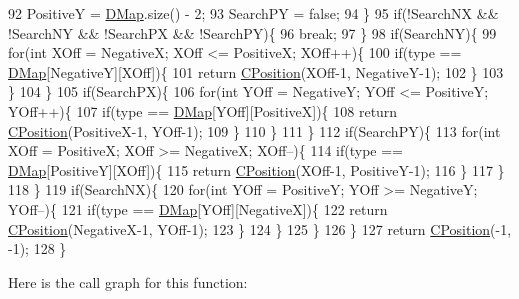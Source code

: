 \begin{DoxyCode}
92             PositiveY = \hyperlink{classCTerrainMap_a80d154ce478948b10473534a7bca13f6}{DMap}.size() - 2;
93             SearchPY = \textcolor{keyword}{false};
94         \}
95         \textcolor{keywordflow}{if}(!SearchNX && !SearchNY && !SearchPX && !SearchPY)\{
96             \textcolor{keywordflow}{break};
97         \}
98         \textcolor{keywordflow}{if}(SearchNY)\{
99             \textcolor{keywordflow}{for}(\textcolor{keywordtype}{int} XOff = NegativeX; XOff <= PositiveX; XOff++)\{
100                 \textcolor{keywordflow}{if}(type == \hyperlink{classCTerrainMap_a80d154ce478948b10473534a7bca13f6}{DMap}[NegativeY][XOff])\{
101                     \textcolor{keywordflow}{return} \hyperlink{classCPosition}{CPosition}(XOff-1, NegativeY-1);
102                 \}
103             \}
104         \}
105         \textcolor{keywordflow}{if}(SearchPX)\{
106             \textcolor{keywordflow}{for}(\textcolor{keywordtype}{int} YOff = NegativeY; YOff <= PositiveY; YOff++)\{
107                 \textcolor{keywordflow}{if}(type == \hyperlink{classCTerrainMap_a80d154ce478948b10473534a7bca13f6}{DMap}[YOff][PositiveX])\{
108                     \textcolor{keywordflow}{return} \hyperlink{classCPosition}{CPosition}(PositiveX-1, YOff-1);
109                 \}
110             \}
111         \}
112         \textcolor{keywordflow}{if}(SearchPY)\{
113             \textcolor{keywordflow}{for}(\textcolor{keywordtype}{int} XOff = PositiveX; XOff >= NegativeX; XOff--)\{
114                 \textcolor{keywordflow}{if}(type == \hyperlink{classCTerrainMap_a80d154ce478948b10473534a7bca13f6}{DMap}[PositiveY][XOff])\{
115                     \textcolor{keywordflow}{return} \hyperlink{classCPosition}{CPosition}(XOff-1, PositiveY-1);
116                 \}
117             \}
118         \}
119         \textcolor{keywordflow}{if}(SearchNX)\{
120             \textcolor{keywordflow}{for}(\textcolor{keywordtype}{int} YOff = PositiveY; YOff >= NegativeY; YOff--)\{
121                 \textcolor{keywordflow}{if}(type == \hyperlink{classCTerrainMap_a80d154ce478948b10473534a7bca13f6}{DMap}[YOff][NegativeX])\{
122                     \textcolor{keywordflow}{return} \hyperlink{classCPosition}{CPosition}(NegativeX-1, YOff-1);
123                 \}
124             \}
125         \}
126     \}
127     \textcolor{keywordflow}{return} \hyperlink{classCPosition}{CPosition}(-1, -1);
128 \}
\end{DoxyCode}
Here is the call graph for this function\+:\nopagebreak
